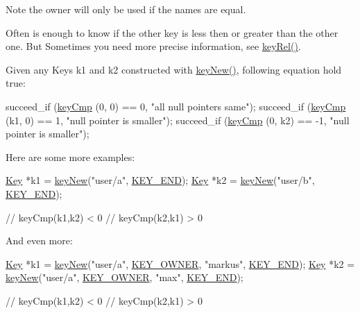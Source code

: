 \begin{DoxyNote}{Note}
the owner will only be used if the names are equal.
\end{DoxyNote}
Often is enough to know if the other key is less then or greater than the other one. But Sometimes you need more precise information, see \hyperlink{group__keytest_ga6bb0f95ac34ce9c42d61bb35a76139d0}{key\+Rel()}.

Given any Keys k1 and k2 constructed with \hyperlink{group__key_gad23c65b44bf48d773759e1f9a4d43b89}{key\+New()}, following equation hold true\+:


\begin{DoxyCodeInclude}
        succeed\_if (\hyperlink{group__keytest_gaf6e66e12fe04d535a5d1c8218ced803e}{keyCmp} (0, 0) == 0, \textcolor{stringliteral}{"all null pointers same"});
        succeed\_if (\hyperlink{group__keytest_gaf6e66e12fe04d535a5d1c8218ced803e}{keyCmp} (k1, 0) == 1, \textcolor{stringliteral}{"null pointer is smaller"});
        succeed\_if (\hyperlink{group__keytest_gaf6e66e12fe04d535a5d1c8218ced803e}{keyCmp} (0, k2) == -1, \textcolor{stringliteral}{"null pointer is smaller"});
\end{DoxyCodeInclude}
 Here are some more examples\+: 
\begin{DoxyCode}
\hyperlink{classkdb_1_1Key_a5679f5cae63caddd64a60388b9cc77fa}{Key} *k1 = \hyperlink{group__key_gad23c65b44bf48d773759e1f9a4d43b89}{keyNew}(\textcolor{stringliteral}{"user/a"}, \hyperlink{group__key_gga91fb3178848bd682000958089abbaf40aa8adb6fcb92dec58fb19410eacfdd403}{KEY\_END});
\hyperlink{classkdb_1_1Key_a5679f5cae63caddd64a60388b9cc77fa}{Key} *k2 = \hyperlink{group__key_gad23c65b44bf48d773759e1f9a4d43b89}{keyNew}(\textcolor{stringliteral}{"user/b"}, \hyperlink{group__key_gga91fb3178848bd682000958089abbaf40aa8adb6fcb92dec58fb19410eacfdd403}{KEY\_END});

\textcolor{comment}{// keyCmp(k1,k2) < 0}
\textcolor{comment}{// keyCmp(k2,k1) > 0}
\end{DoxyCode}


And even more\+: 
\begin{DoxyCode}
\hyperlink{classkdb_1_1Key_a5679f5cae63caddd64a60388b9cc77fa}{Key} *k1 = \hyperlink{group__key_gad23c65b44bf48d773759e1f9a4d43b89}{keyNew}(\textcolor{stringliteral}{"user/a"}, \hyperlink{group__key_gga91fb3178848bd682000958089abbaf40a77ca60362fa8daca8d5347db4385068b}{KEY\_OWNER}, \textcolor{stringliteral}{"markus"}, \hyperlink{group__key_gga91fb3178848bd682000958089abbaf40aa8adb6fcb92dec58fb19410eacfdd403}{KEY\_END});
\hyperlink{classkdb_1_1Key_a5679f5cae63caddd64a60388b9cc77fa}{Key} *k2 = \hyperlink{group__key_gad23c65b44bf48d773759e1f9a4d43b89}{keyNew}(\textcolor{stringliteral}{"user/a"}, \hyperlink{group__key_gga91fb3178848bd682000958089abbaf40a77ca60362fa8daca8d5347db4385068b}{KEY\_OWNER}, \textcolor{stringliteral}{"max"}, \hyperlink{group__key_gga91fb3178848bd682000958089abbaf40aa8adb6fcb92dec58fb19410eacfdd403}{KEY\_END});

\textcolor{comment}{// keyCmp(k1,k2) < 0}
\textcolor{comment}{// keyCmp(k2,k1) > 0}
\end{DoxyCode}


